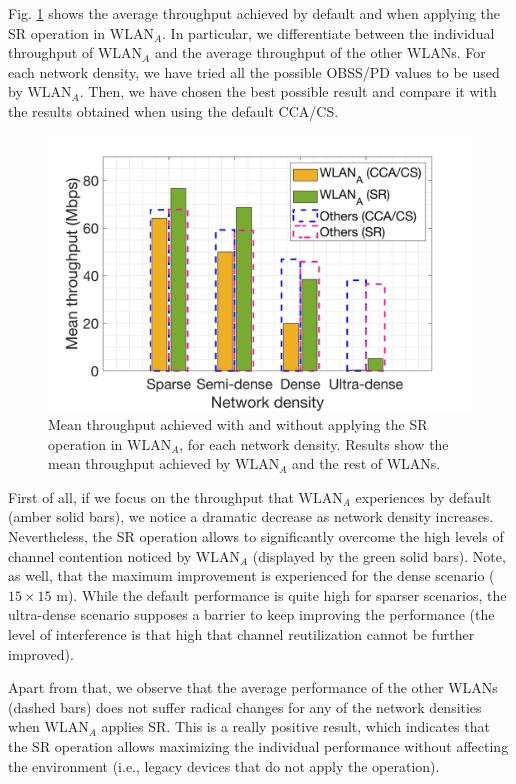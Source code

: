 \documentclass[comsoc]{IEEEtran}
\begin{document}
	Fig. \ref{fig:SIM_2_1} shows the average throughput achieved by default and when applying the SR operation in $\text{WLAN}_A$. In particular, we differentiate between the individual throughput of $\text{WLAN}_A$ and the average throughput of the other WLANs. For each network density, we have tried all the possible OBSS/PD values to be used by $\text{WLAN}_A$. Then, we have chosen the best possible result and compare it with the results obtained when using the default CCA/CS.
	
	\begin{figure}[ht!]
		\centering		
		\includegraphics[width=\columnwidth]{SIM_2_1}
		\caption{Mean throughput achieved with and without applying the SR operation in $\text{WLAN}_A$, for each network density. Results show the mean throughput achieved by $\text{WLAN}_A$ and the rest of WLANs.}
		\label{fig:SIM_2_1}
	\end{figure}
	
	First of all, if we focus on the throughput that $\text{WLAN}_A$ experiences by default (amber solid bars), we notice a dramatic decrease as network density increases. Nevertheless, the SR operation allows to significantly overcome the high levels of channel contention noticed by $\text{WLAN}_A$ (displayed by the green solid bars). Note, as well, that the maximum improvement is experienced for the dense scenario ($15\times15$ m). While the default performance is quite high for sparser scenarios, the ultra-dense scenario supposes a barrier to keep improving the performance (the level of interference is that high that channel reutilization cannot be further improved).
	
	Apart from that, we observe that the average performance of the other WLANs (dashed bars) does not suffer radical changes for any of the network densities when $\text{WLAN}_A$ applies SR. This is a really positive result, which indicates that the SR operation allows maximizing the individual performance without affecting the environment (i.e., legacy devices that do not apply the operation).
	
\end{document}
